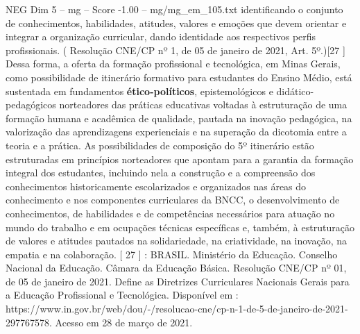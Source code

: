 \begin{textsample}{NEG Dim 5 – mg – Score -1.00 – mg/mg\_em\_105.txt}
identificando o conjunto de conhecimentos, habilidades, atitudes, valores e emoções que devem orientar e integrar a organização curricular, dando identidade aos respectivos perfis profissionais. ( Resolução CNE/CP nº 1, de 05 de janeiro de 2021, Art. 5º.)[27 ] Dessa forma, a oferta da formação profissional e tecnológica, em Minas Gerais, como possibilidade de itinerário formativo para estudantes do Ensino Médio, está sustentada em fundamentos \textbf{ético-políticos}, epistemológicos e didático-pedagógicos norteadores das práticas educativas voltadas à estruturação de uma formação humana e acadêmica de qualidade, pautada na inovação pedagógica, na valorização das aprendizagens experienciais e na superação da dicotomia entre a teoria e a prática.
As possibilidades de composição do 5º itinerário estão estruturadas em princípios norteadores que apontam para a garantia da formação integral dos estudantes, incluindo nela a construção e a compreensão dos conhecimentos historicamente escolarizados e organizados nas áreas do conhecimento e nos componentes curriculares da BNCC, o desenvolvimento de conhecimentos, de habilidades e de competências necessários para atuação no mundo do trabalho e em ocupações técnicas específicas e, também, à estruturação de valores e atitudes pautados na solidariedade, na criatividade, na inovação, na empatia e na colaboração. [ 27 ] : BRASIL.
Ministério da Educação.
Conselho Nacional da Educação.
Câmara da Educação Básica.
Resolução CNE/CP nº 01, de 05 de janeiro de 2021.
Define as Diretrizes Curriculares Nacionais Gerais para a Educação Profissional e Tecnológica.
Disponível em : https://www.in.gov.br/web/dou/-/resolucao-cne/cp-n-1-de-5-de-janeiro-de-2021-297767578.
Acesso em 28 de março de 2021.

\end{textsample}
